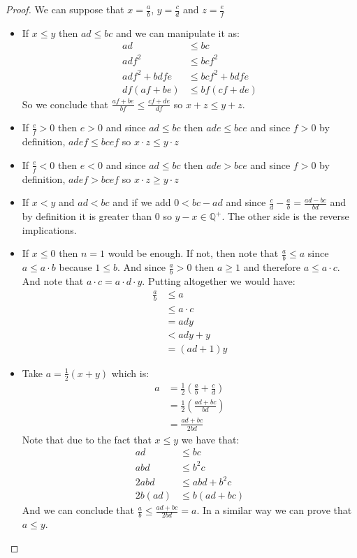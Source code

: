 \documentclass{tufte-handout}
\begin{document}
\begin{proof}
	We can suppose that $x = \frac{a}{b}$, $y = \frac{c}{d}$ and $z = \frac{e}{f}$
	\begin{itemize}
		\item If $x \le y$ then $ad \le bc$ and we can manipulate it as:
		\begin{align*}
			ad &\le bc\\
			adf^2 &\le bcf^2\\
			adf^2 + bdfe &\le bcf^2 + bdfe\\
			df(af+be) &\le bf(cf+de)
		\end{align*}
		So we conclude that $\frac{af+be}{bf} \le \frac{cf+de}{df}$ so $x + z \le y + z$.

		\item If $\frac{e}{f} > 0$ then $e > 0$ and since $ad \le bc$ then $ade \le bce$ and since $f > 0$ by definition, $adef \le bcef$ so $x \cdot z \le y \cdot z$
		\item If $\frac{e}{f} < 0$ then $e < 0$ and since $ad \le bc$ then $ade > bce$ and since $f > 0$ by definition, $adef > bcef$ so $x \cdot z \ge y \cdot z$
		\item If $x < y$ and $ad < bc$ and if we add $0 < bc - ad$ and since $\frac{c}{d} - \frac{a}{b} = \frac{ad-bc}{bd}$ and by definition it is greater than $0$ so $y - x \in \mathbb{Q}^+$. The other side is the reverse implications.
		\item If $x \le 0$ then $n = 1$ would be enough. If not, then note that $\frac{a}{b} \le a$ since $a \le a\cdot b$ because $1 \le b$. And since $\frac{a}{b} > 0$ then $a \ge 1$ and therefore $a \le a \cdot c$. And note that $a \cdot c= a\cdot d \cdot y$. Putting altogether we would have:
		\begin{align*}
			\frac{a}{b} &\le a\\
			&\le a \cdot c\\
			&= ady\\
			&< ady + y\\
			&= (ad+1)y
		\end{align*}

		\item Take $a = \frac{1}{2} (x + y)$ which is:
		\begin{align*}
			a &= \frac{1}{2} \left(\frac{a}{b} + \frac{c}{d}\right)\\
			&= \frac{1}{2} \left(\frac{ad+bc}{bd}\right)\\
			&= \frac{ad+bc}{2bd}
		\end{align*}
		Note that due to the fact that $x \le y$ we have that:
		\begin{align*}
			ad &\le bc\\
			abd &\le b^2c\\
			2abd &\le abd + b^2c\\
			2b(ad) &\le b(ad + bc)
		\end{align*}
		And we can conclude that $\frac{a}{b} \le \frac{ad+bc}{2bd} = a$. In a similar way we can prove that $a \le y$.
	\end{itemize}
\end{proof}
\end{document}
